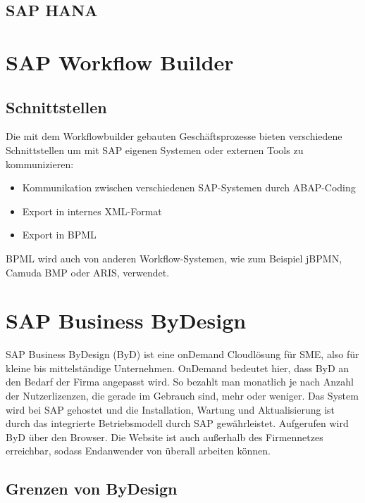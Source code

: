 \documentclass{handout}
\begin{document}
\subsection{SAP HANA}

\newpage

\section{SAP Workflow Builder}


\newpage

\subsection{Schnittstellen}

Die mit dem Workflowbuilder gebauten Geschäftsprozesse bieten verschiedene Schnittstellen um mit SAP eigenen Systemen oder externen Tools zu kommunizieren:

\begin{itemize}
\item Kommunikation zwischen verschiedenen SAP-Systemen durch ABAP-Coding
\item Export in internes XML-Format
\item Export in BPML
\end{itemize}

BPML wird auch von anderen Workflow-Systemen, wie zum Beispiel jBPMN, Camuda BMP oder ARIS, verwendet.

\section{SAP Business ByDesign}

SAP Business ByDesign (ByD) ist eine onDemand Cloudlösung für SME, also für kleine bis mittelständige Unternehmen. OnDemand bedeutet hier, dass ByD an den Bedarf der Firma angepasst wird. So bezahlt man monatlich je nach Anzahl der Nutzerlizenzen, die gerade im Gebrauch sind, mehr oder weniger. Das System wird bei SAP gehostet und die Installation, Wartung und Aktualisierung ist durch das integrierte Betriebsmodell durch SAP gewährleistet. Aufgerufen wird ByD über den Browser. Die Website ist auch außerhalb des Firmennetzes erreichbar, sodass Endanwender von überall arbeiten können.

\subsection{Grenzen von ByDesign}
\end{document}
